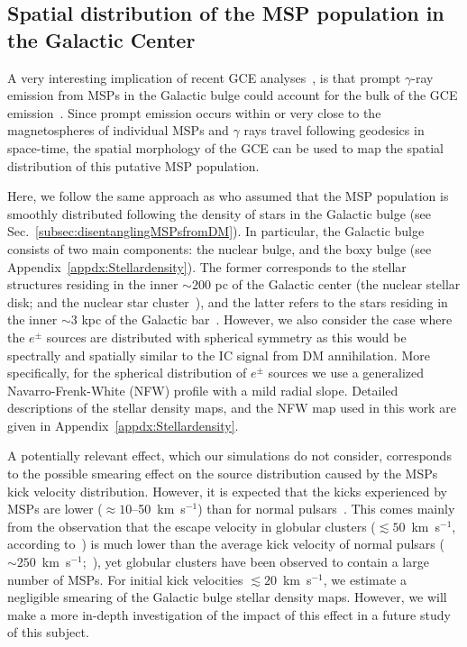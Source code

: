 \documentclass[doublespace,nopageskip]{VTthesis} %
\begin{document}
\subsection{Spatial distribution of the MSP population in the Galactic Center}
\label{subsec:spatialdistribution}

A very interesting implication of recent GCE analyses~\citep{Macias:2016nev,Bartels:2017vsx,Macias:2019omb,Abazajian:2020tww}, is that prompt $\gamma$-ray emission from MSPs in the Galactic bulge could account for the bulk of the GCE emission~\citep{Abazajian:2012pn}. Since 
prompt emission occurs within or very close to the magnetospheres of individual MSPs and
$\gamma$ rays travel following geodesics in space-time, the spatial morphology of the GCE can be used to map the spatial distribution of this putative MSP population.

Here, we follow the same approach as \cite{Song:2019nrx} who assumed that the MSP population is smoothly distributed following the density of stars in the Galactic bulge (see Sec.~\ref{subsec:disentanglingMSPsfromDM}). 
In particular, the Galactic bulge consists of two main components: the nuclear bulge, and the boxy bulge (see Appendix~\ref{appdx:Stellardensity}). The former corresponds to the stellar structures residing in the inner $\sim 200$ pc of the Galactic center (the nuclear stellar disk; and the nuclear star cluster~\citealt{Launhardt:2002tx}), and the latter refers to the stars residing in the inner $\sim3$ kpc of the Galactic bar~\citep{Freudenreich:1998,Coleman:2019kax}. However, we also consider the 
case where the $e^\pm$ sources are distributed with spherical symmetry as this would be spectrally and spatially similar to the IC signal from DM annihilation. 
More specifically, for the spherical distribution of 
$e^\pm$ sources we use a generalized Navarro-Frenk-White (NFW) profile with a mild radial slope. 
Detailed descriptions of the stellar density maps, and the NFW map used in this work are given in Appendix~\ref{appdx:Stellardensity}. 

A potentially relevant effect, which our simulations do not consider, corresponds to the possible smearing effect on the source distribution caused by the MSPs kick velocity distribution. However, it is expected that the kicks experienced by MSPs are lower ($\approx 10$--50~km~s$^{-1}$) than for normal pulsars~\citep{Podsiadlowski:2005}. This comes mainly from the observation that the escape velocity in globular clusters ($\lesssim 50$~km~s$^{-1}$, according to~\citealt{Pfahl:2001df}) is much lower than the average kick velocity of normal pulsars ($\sim 250$~km~s$^{-1}$;~\citealt{Hobbs:2005yx,Atri:2019fbx}), yet globular clusters have been observed to contain a large number of MSPs. For initial kick velocities $\lesssim 20$~km~s$^{-1}$, we estimate a negligible smearing of the Galactic bulge stellar density maps. However, we will make a more in-depth investigation of the impact of this effect in a future study of this subject. 
\end{document}
